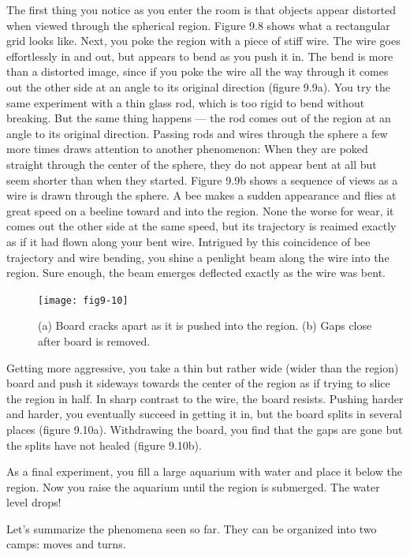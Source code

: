 \documentclass{book}
\begin{document}
The first thing you notice as you enter the room is that objects appear
distorted when viewed through the spherical region. Figure 9.8 shows
what a rectangular grid looks like. Next, you poke the region with a
piece of stiff wire. The wire goes effortlessly in and out, but appears to
bend as you push it in. The bend is more than a distorted image, since if
you poke the wire all the way through it comes out the other side at an
angle to its original direction (figure 9.9a). You try the same experiment
with a thin glass rod, which is too rigid to bend without breaking. But
the same thing happens --- the rod comes out of the region at an angle
to its original direction. Passing rods and wires through the sphere a
few more times draws attention to another phenomenon: When they
are poked straight through the center of the sphere, they do not appear
bent at all but seem shorter than when they started. Figure 9.9b shows
a sequence of views as a wire is drawn through the sphere.
A bee makes a sudden appearance and flies at great speed on a beeline
toward and into the region. None the worse for wear, it comes out the
other side at the same speed, but its trajectory is reaimed exactly as if
it had flown along your bent wire. Intrigued by this coincidence of bee
trajectory and wire bending, you shine a penlight beam along the wire
into the region. Sure enough, the beam emerges deflected exactly as the
wire was bent.

\begin{figure}
\begin{center}
\texttt{[image: fig9-10]}
\caption{(a) Board cracks apart as it is pushed into the region. (b) Gaps close after board is removed.}
\end{center}
\end{figure}

Getting more aggressive, you take a thin but rather wide (wider than
the region) board and push it sideways towards the center of the region
as if trying to slice the region in half. In sharp contrast to the wire,
the board resists. Pushing harder and harder, you eventually succeed
in getting it in, but the board splits in several places (figure 9.10a).
Withdrawing the board, you find that the gaps are gone but the splits
have not healed (figure 9.10b).

As a final experiment, you fill a large aquarium with water and place
it below the region. Now you raise the aquarium until the region is
submerged. The water level drops!

Let's summarize the phenomena seen so far. They can be organized
into two camps: moves and turns.
\end{document}

